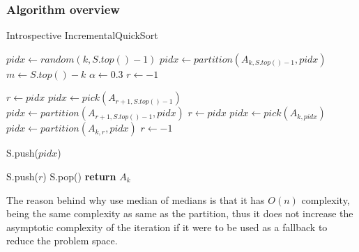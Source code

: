 \subsubsection{Algorithm overview}
\begin{algorithm}
  \begin{algorithmic}[1]
    \caption{Introspective IncrementalQuickSort}\label{ALG:IIQS}
      \State $pidx \gets random(k,S.top()-1)$
      \State $pidx \gets partition(A_{k,S.top()-1}, pidx)$
      \State $m \gets S.top() - k$
      \State $\alpha \gets 0.3$
      \State $r \gets -1$

        \State $r \gets pidx$
        \State $pidx \gets pick(A_{r+1,S.top()-1})$
        \State $pidx \gets partition(A_{r+1,S.top()-1},pidx)$
        \State $r \gets pidx$
        \State $pidx \gets pick(A_{k,pidx})$
        \State $pidx \gets partition(A_{k,r}, pidx)$
        \State $r \gets -1$
      \EndIf

      \State S.push($pidx$)

        \State S.push($r$)
      \EndIf  
    \EndWhile
    \State S.pop()
    \State \textbf{return} $A_{k}$\label{IIQS_main_cycle}
    \EndProcedure
  \end{algorithmic}
\end{algorithm}

The reason behind why use median of medians is that it has $O(n)$ complexity, being the same complexity as same as the partition, thus it does not increase the asymptotic complexity of the iteration if it were to be used as a fallback to reduce the problem space.\\

\FloatBarrier